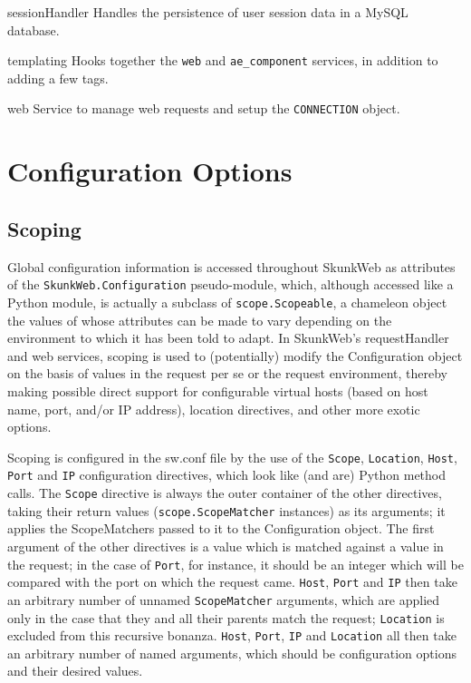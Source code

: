\documentclass[titlepage]{manual}
\begin{document}
\begin{argdesc}
\item[sessionHandler]  Handles the persistence of user session data in
a MySQL database.

\item[templating] Hooks together the \texttt{web} and \texttt{ae_component}
services, in addition to adding a few tags.


\item[web] Service to manage web requests and setup the
\texttt{CONNECTION} object.
\end{argdesc}

\section{Configuration Options}

\subsection{Scoping}

Global configuration information is accessed throughout SkunkWeb as attributes of the 
\texttt{SkunkWeb.Configuration} pseudo-module, which, although accessed like a Python module,
is actually a subclass of \texttt{scope.Scopeable}, a chameleon object the values of whose attributes can be 
made to vary depending on the environment to which it has been told to adapt.
In SkunkWeb's requestHandler and web services, scoping is used to (potentially) modify the Configuration
object on the basis of values in the request per se or the request environment, thereby making possible
direct support for configurable virtual hosts (based on host name, port, and/or IP address), 
location directives, and other more exotic options.

Scoping is configured in the sw.conf file by the use of the \texttt{Scope}, \texttt{Location}, \texttt{Host}, 
\texttt{Port} and \texttt{IP} configuration directives, which look like (and are) Python method calls.  The 
\texttt{Scope} directive 
is always the outer container of the other directives, taking their return values (\texttt{scope.ScopeMatcher}
instances) as its arguments; it applies the ScopeMatchers passed to it to the Configuration object.  
The first argument of the other directives is a value which is matched against a value 
in the request; in the case of \texttt{Port}, for instance, it should be an integer which will be 
compared with the 
port on which the request came.  \texttt{Host}, \texttt{Port} and \texttt{IP} then take an arbitrary 
number of unnamed \texttt{ScopeMatcher}
arguments, which are applied only in the case that they and all their parents match the request; 
\texttt{Location} is excluded from this recursive bonanza.  
\texttt{Host}, \texttt{Port}, \texttt{IP} and \texttt{Location} all then take an arbitrary 
number of named arguments, which should be configuration options and their desired values.
\end{document}
